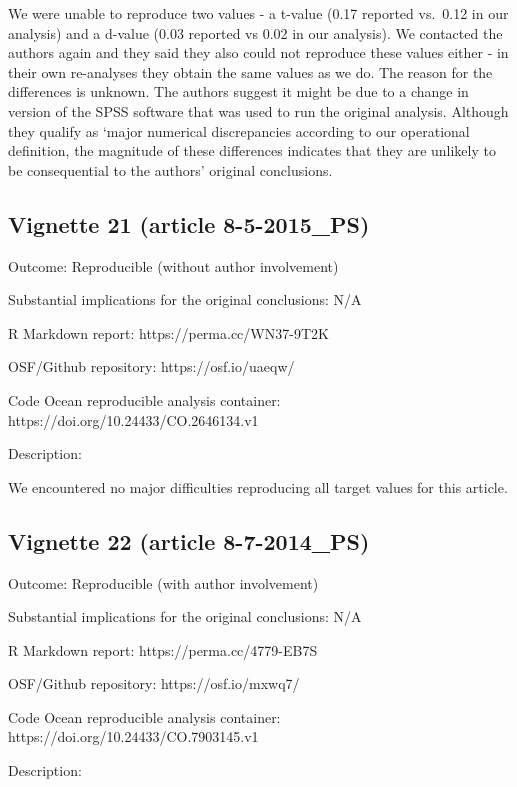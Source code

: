 \documentclass[english,,man,floatsintext]{apa6}
\begin{document}
\begin{appendix}
We were unable to reproduce two values - a t-value (0.17 reported
vs.~0.12 in our analysis) and a d-value (0.03 reported vs 0.02 in our
analysis). We contacted the authors again and they said they also could
not reproduce these values either - in their own re-analyses they obtain
the same values as we do. The reason for the differences is unknown. The
authors suggest it might be due to a change in version of the SPSS
software that was used to run the original analysis. Although they
qualify as `major numerical discrepancies according to our operational
definition, the magnitude of these differences indicates that they are
unlikely to be consequential to the authors' original conclusions.

\hypertarget{vignette-21-article-8-5-2015_ps}{%
\subsection{Vignette 21 (article
8-5-2015\_PS)}\label{vignette-21-article-8-5-2015_ps}}

Outcome: Reproducible (without author involvement)

Substantial implications for the original conclusions: N/A

R Markdown report: https://perma.cc/WN37-9T2K

OSF/Github repository: https://osf.io/uaeqw/

Code Ocean reproducible analysis container:
https://doi.org/10.24433/CO.2646134.v1

Description:

We encountered no major difficulties reproducing all target values for
this article.

\hypertarget{vignette-22-article-8-7-2014_ps}{%
\subsection{Vignette 22 (article
8-7-2014\_PS)}\label{vignette-22-article-8-7-2014_ps}}

Outcome: Reproducible (with author involvement)

Substantial implications for the original conclusions: N/A

R Markdown report: https://perma.cc/4779-EB7S

OSF/Github repository: https://osf.io/mxwq7/

Code Ocean reproducible analysis container:
https://doi.org/10.24433/CO.7903145.v1

Description:


\end{appendix}
\end{document}
